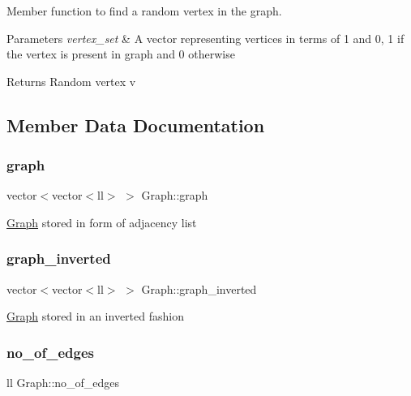 Member function to find a random vertex in the graph. 


\begin{DoxyParams}{Parameters}
{\em vertex\+\_\+set} & A vector representing vertices in terms of 1 and 0, 1 if the vertex is present in graph and 0 otherwise \\
\hline
\end{DoxyParams}
\begin{DoxyReturn}{Returns}
Random vertex v 
\end{DoxyReturn}


\subsection{Member Data Documentation}
\mbox{\label{classGraph_ab8435b2eb808e20c78688da1818a3a8a}} 
\subsubsection{\texorpdfstring{graph}{graph}}
{\footnotesize\ttfamily vector$<$vector$<$ll$>$ $>$ Graph\+::graph}

\hyperlink{classGraph}{Graph} stored in form of adjacency list \mbox{\label{classGraph_ab0d5142a7def6b33069b6dbaba9fdf1c}} 
\subsubsection{\texorpdfstring{graph\+\_\+inverted}{graph\_inverted}}
{\footnotesize\ttfamily vector$<$vector$<$ll$>$ $>$ Graph\+::graph\+\_\+inverted}

\hyperlink{classGraph}{Graph} stored in an inverted fashion \mbox{\label{classGraph_a49735f451a8a2cd7ae8334df2adb42cf}} 
\subsubsection{\texorpdfstring{no\+\_\+of\+\_\+edges}{no\_of\_edges}}
{\footnotesize\ttfamily ll Graph\+::no\+\_\+of\+\_\+edges}

